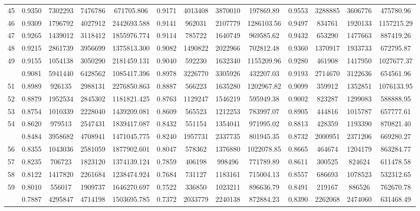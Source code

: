 \documentclass[
  12pt,
]{article}
\begin{document}
\begin{longtable}[t]{lcccccccccccc}
45 & 0.9350 & 7302293 & 7476786 & 671705.806 & 0.9171 & 4013408 & 3870010 & 197869.89 & 0.9553 & 3288885 & 3606776 & 475780.96\\
46 & 0.9309 & 1796792 & 4027912 & 2442693.588 & 0.9141 & 962031 & 2107779 & 1286103.56 & 0.9497 & 834761 & 1920133 & 1157215.29\\
47 & 0.9265 & 1439012 & 3118412 & 1855976.774 & 0.9114 & 785722 & 1640749 & 969585.62 & 0.9432 & 653290 & 1477663 & 887419.26\\
48 & 0.9215 & 2861739 & 3956699 & 1375813.300 & 0.9082 & 1490822 & 2022966 & 702812.48 & 0.9360 & 1370917 & 1933733 & 672795.87\\
49 & 0.9155 & 1054138 & 3050290 & 2181459.131 & 0.9040 & 592230 & 1632340 & 1155209.96 & 0.9280 & 461908 & 1417950 & 1027677.37\\
\addlinespace
50 & 0.9081 & 5941440 & 6428562 & 1085417.396 & 0.8978 & 3226770 & 3305926 & 432207.03 & 0.9193 & 2714670 & 3122636 & 654561.96\\
51 & 0.8989 & 926135 & 2988131 & 2276850.863 & 0.8887 & 566223 & 1635280 & 1202967.82 & 0.9099 & 359912 & 1352851 & 1076133.95\\
52 & 0.8879 & 1952534 & 2845302 & 1181821.425 & 0.8763 & 1129247 & 1546219 & 595949.38 & 0.9002 & 823287 & 1299083 & 588888.95\\
53 & 0.8754 & 1010339 & 2228040 & 1439209.081 & 0.8609 & 565523 & 1212253 & 783997.07 & 0.8905 & 444816 & 1015787 & 657777.61\\
54 & 0.8620 & 979513 & 2547431 & 1839417.087 & 0.8432 & 551154 & 1354041 & 971995.02 & 0.8813 & 428359 & 1193390 & 870821.40\\
\addlinespace
55 & 0.8484 & 3958682 & 4708941 & 1471045.775 & 0.8240 & 1957731 & 2337735 & 801945.35 & 0.8732 & 2000951 & 2371206 & 669280.27\\
56 & 0.8355 & 1043036 & 2581059 & 1877902.601 & 0.8047 & 578362 & 1376880 & 1022078.85 & 0.8665 & 464674 & 1204179 & 863284.77\\
57 & 0.8235 & 706723 & 1823120 & 1374139.124 & 0.7859 & 406198 & 998496 & 771789.89 & 0.8611 & 300525 & 824624 & 611478.58\\
58 & 0.8122 & 1417820 & 2261684 & 1238474.924 & 0.7684 & 731127 & 1183161 & 715004.13 & 0.8557 & 686693 & 1078523 & 532312.65\\
59 & 0.8010 & 556017 & 1909737 & 1646270.697 & 0.7522 & 336850 & 1023211 & 896636.79 & 0.8491 & 219167 & 886526 & 762670.78\\
\addlinespace
60 & 0.7887 & 4295847 & 4714198 & 1503695.785 & 0.7372 & 2033779 & 2240138 & 872884.23 & 0.8390 & 2262068 & 2474060 & 631468.49\\

\end{longtable}
\end{document}
